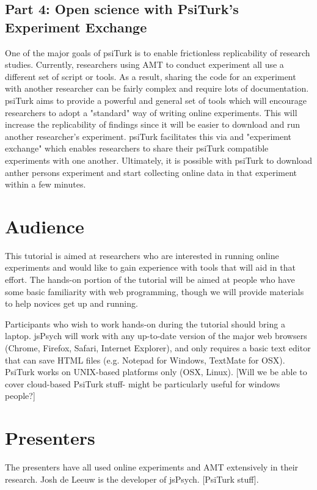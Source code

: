 \documentclass[10pt,letterpaper]{article}
\begin{document}
\subsection{Part 4: Open science with PsiTurk's Experiment Exchange}

One of the major goals of psiTurk is to enable frictionless replicability of research studies.  Currently, researchers using AMT to conduct
experiment all use a different set of script or tools.  As a result, sharing the code for an experiment with another researcher can be fairly complex
and require lots of documentation.  psiTurk aims to provide a powerful and general set of tools which will encourage researchers to adopt
a "standard" way of writing online experiments.  This will increase the replicability of findings since it will be easier to download and run
another researcher's experiment.  psiTurk facilitates this via and "experiment exchange" which enables researchers to share their psiTurk
compatible experiments with one another.  Ultimately, it is possible with psiTurk to download anther persons experiment and start collecting
online data in that experiment within a few minutes.

\section{Audience}

This tutorial is aimed at researchers who are interested in running online experiments and would like to gain experience with tools that will aid in that effort. The hands-on portion of the tutorial will be aimed at people who have some basic familiarity with web programming, though we will provide materials to help novices get up and running. 

Participants who wish to work hands-on during the tutorial should bring a laptop. jsPsych will work with any up-to-date version of the major web browsers (Chrome, Firefox, Safari, Internet Explorer), and only requires a basic text editor that can save HTML files (e.g. Notepad for Windows, TextMate for OSX). PsiTurk works on UNIX-based platforms only (OSX, Linux). [Will we be able to cover cloud-based PsiTurk stuff- might be particularly useful for windows people?]

\section{Presenters}

The presenters have all used online experiments and AMT extensively in their research. Josh de Leeuw is the developer of jsPsych. [PsiTurk stuff].




\setlength{\bibleftmargin}{.125in}
\setlength{\bibindent}{-\bibleftmargin}


\end{document}
